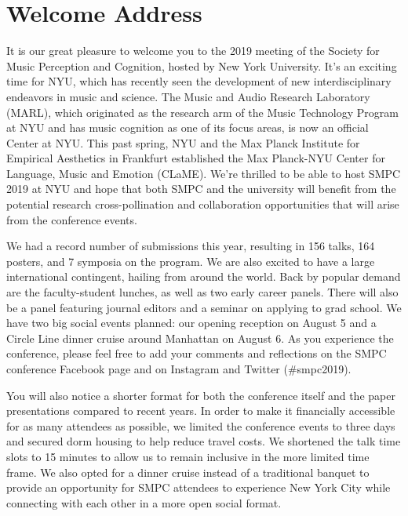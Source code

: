 
\section*{Welcome Address}

It is our great pleasure to welcome you to the 2019 meeting of the Society for Music Perception and Cognition, hosted by New York University.  It's an exciting time for NYU, which has recently seen the development of new interdisciplinary endeavors in music and science.  The Music and Audio Research Laboratory (MARL), which originated as the research arm of the Music Technology Program at NYU and has music cognition as one of its focus areas, is now an official Center at NYU. This past spring, NYU and the Max Planck Institute for Empirical Aesthetics in Frankfurt established the Max Planck-NYU Center for Language, Music and Emotion (CLaME).  We're thrilled to be able to host SMPC 2019 at NYU and hope that both SMPC and the university will benefit from the potential research cross-pollination and collaboration opportunities that will arise from the conference events.
 
We had a record number of submissions this year, resulting in 156 talks, 164 posters, and 7 symposia on the program.  We are also excited to have a large international contingent, hailing from around the world.  Back by popular demand are the faculty-student lunches, as well as two early career panels.  There will also be a panel featuring journal editors and a seminar on applying to grad school.  We have two big social events planned: our opening reception on August 5 and a Circle Line dinner cruise around Manhattan on August 6.  As you experience the conference, please feel free to add your comments and reflections on the SMPC conference Facebook page and on Instagram and Twitter (\#smpc2019).
 
You will also notice a shorter format for both the conference itself and the paper presentations compared to recent years. In order to make it financially accessible for as many attendees as possible, we limited the conference events to three days and secured dorm housing to help reduce travel costs. We shortened the talk time slots to 15 minutes to allow us to remain inclusive in the more limited time frame. We also opted for a dinner cruise instead of a traditional banquet to provide an opportunity for SMPC attendees to experience New York City while connecting with each other in a more open social format. 
 
